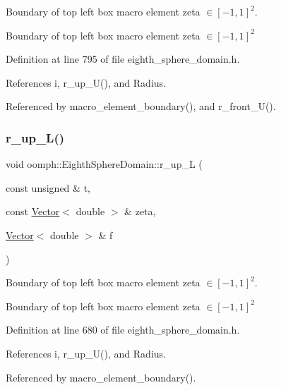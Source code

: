 Boundary of top left box macro element zeta $ \in [-1,1]^2 $. 

Boundary of top left box macro element zeta $ \in [-1,1]^2 $ 

Definition at line 795 of file eighth\+\_\+sphere\+\_\+domain.\+h.



References i, r\+\_\+up\+\_\+\+U(), and Radius.



Referenced by macro\+\_\+element\+\_\+boundary(), and r\+\_\+front\+\_\+\+U().

\mbox{\label{classoomph_1_1EighthSphereDomain_af9ab515958ed3699ea5ed95ec9a87d9e}} 
\subsubsection{\texorpdfstring{r\+\_\+up\+\_\+\+L()}{r\_up\_L()}}
{\footnotesize\ttfamily void oomph\+::\+Eighth\+Sphere\+Domain\+::r\+\_\+up\+\_\+L (\begin{DoxyParamCaption}\item[{const unsigned \&}]{t,  }\item[{const \hyperlink{classoomph_1_1Vector}{Vector}$<$ double $>$ \&}]{zeta,  }\item[{\hyperlink{classoomph_1_1Vector}{Vector}$<$ double $>$ \&}]{f }\end{DoxyParamCaption})\hspace{0.3cm}{\ttfamily [private]}}



Boundary of top left box macro element zeta $ \in [-1,1]^2 $. 

Boundary of top left box macro element zeta $ \in [-1,1]^2 $ 

Definition at line 680 of file eighth\+\_\+sphere\+\_\+domain.\+h.



References i, r\+\_\+up\+\_\+\+U(), and Radius.



Referenced by macro\+\_\+element\+\_\+boundary().

\mbox{\label{classoomph_1_1EighthSphereDomain_ad38d27ad06d83c94c768fbda98c939e7}} 
